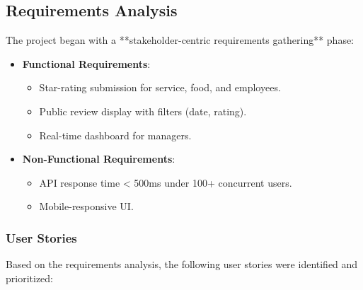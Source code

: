 \subsection{Requirements Analysis}
\label{subsec:requirements}
The project began with a **stakeholder-centric requirements gathering** phase:
\begin{itemize}
    \item \textbf{Functional Requirements}:
    \begin{itemize}
        \item Star-rating submission for service, food, and employees.
        \item Public review display with filters (date, rating).
        \item Real-time dashboard for managers.
    \end{itemize}
    \item \textbf{Non-Functional Requirements}:
    \begin{itemize}
        \item API response time < 500ms under 100+ concurrent users.
        \item Mobile-responsive UI.
    \end{itemize}
\end{itemize}

\subsubsection{User Stories}
\label{subsubsec:user_stories}

Based on the requirements analysis, the following user stories were identified and prioritized:

